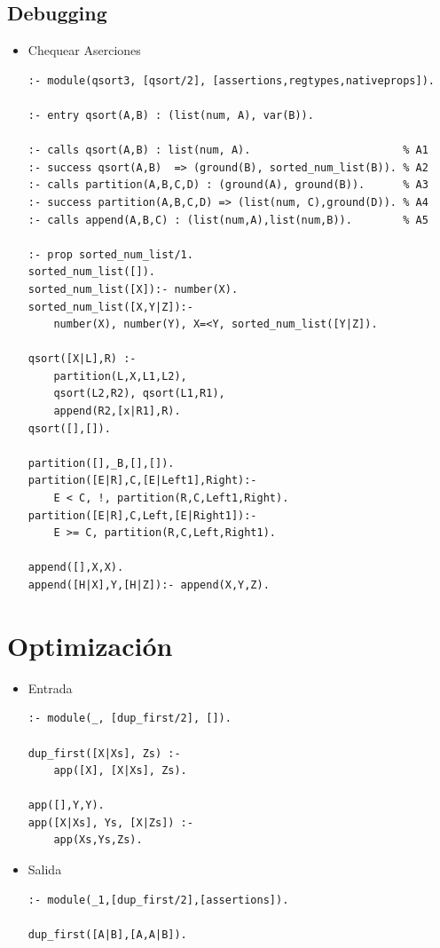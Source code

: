 \documentclass[11pt]{article}
\begin{document}
\subsection*{Debugging}
\label{sec:org4b98981}
\begin{itemize}
\item Chequear Aserciones
\begin{verbatim}
:- module(qsort3, [qsort/2], [assertions,regtypes,nativeprops]).

:- entry qsort(A,B) : (list(num, A), var(B)).

:- calls qsort(A,B) : list(num, A).                        % A1
:- success qsort(A,B)  => (ground(B), sorted_num_list(B)). % A2
:- calls partition(A,B,C,D) : (ground(A), ground(B)).      % A3
:- success partition(A,B,C,D) => (list(num, C),ground(D)). % A4
:- calls append(A,B,C) : (list(num,A),list(num,B)).        % A5

:- prop sorted_num_list/1.
sorted_num_list([]).
sorted_num_list([X]):- number(X).
sorted_num_list([X,Y|Z]):- 
    number(X), number(Y), X=<Y, sorted_num_list([Y|Z]).

qsort([X|L],R) :-
    partition(L,X,L1,L2),
    qsort(L2,R2), qsort(L1,R1),
    append(R2,[x|R1],R).
qsort([],[]).

partition([],_B,[],[]).
partition([E|R],C,[E|Left1],Right):-
    E < C, !, partition(R,C,Left1,Right).
partition([E|R],C,Left,[E|Right1]):-
    E >= C, partition(R,C,Left,Right1).

append([],X,X).
append([H|X],Y,[H|Z]):- append(X,Y,Z).
\end{verbatim}
\end{itemize}

\section*{Optimización}
\label{sec:orgf9bc468}
\begin{itemize}
\item Entrada
\begin{verbatim}
:- module(_, [dup_first/2], []).

dup_first([X|Xs], Zs) :-
    app([X], [X|Xs], Zs).

app([],Y,Y).
app([X|Xs], Ys, [X|Zs]) :-
    app(Xs,Ys,Zs).
\end{verbatim}

\item Salida 
\begin{verbatim}
:- module(_1,[dup_first/2],[assertions]).

dup_first([A|B],[A,A|B]).

\end{verbatim}
\end{itemize}
\end{document}
